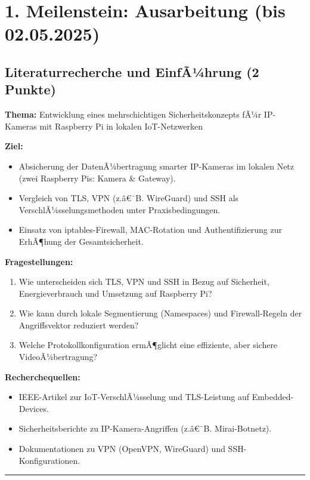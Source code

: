 ﻿\documentclass[a4paper,12pt]{article}
\begin{document}
\section*{1. Meilenstein: Ausarbeitung (bis 02.05.2025)}

\subsection*{Literaturrecherche und EinfÃ¼hrung (2 Punkte)}

\textbf{Thema:} Entwicklung eines mehrschichtigen Sicherheitskonzepts fÃ¼r IP-Kameras mit Raspberry Pi in lokalen IoT-Netzwerken

\bigskip
\textbf{Ziel:}
\begin{itemize}
    \item Absicherung der DatenÃ¼bertragung smarter IP-Kameras im lokalen Netz (zwei Raspberry Pis: Kamera \& Gateway).
    \item Vergleich von TLS, VPN (z.â€¯B. WireGuard) und SSH als VerschlÃ¼sselungsmethoden unter Praxisbedingungen.
    \item Einsatz von iptables-Firewall, MAC-Rotation und Authentifizierung zur ErhÃ¶hung der Gesamtsicherheit.
\end{itemize}

\bigskip
\textbf{Fragestellungen:}
{\renewcommand{\labelenumi}{\arabic*.}%
\begin{enumerate}
    \item Wie unterscheiden sich TLS, VPN und SSH in Bezug auf Sicherheit, Energieverbrauch und Umsetzung auf Raspberry Pi?
    \item Wie kann durch lokale Segmentierung (Namespaces) und Firewall-Regeln der Angriffsvektor reduziert werden?
    \item Welche Protokollkonfiguration ermÃ¶glicht eine effiziente, aber sichere VideoÃ¼bertragung?
\end{enumerate}
}

\bigskip
\textbf{Recherchequellen:}
\begin{itemize}
    \item IEEE-Artikel zur IoT-VerschlÃ¼sselung und TLS-Leistung auf Embedded-Devices.
    \item Sicherheitsberichte zu IP-Kamera-Angriffen (z.â€¯B. Mirai-Botnetz).
    \item Dokumentationen zu VPN (OpenVPN, WireGuard) und SSH-Konfigurationen.
\end{itemize}

\bigskip
\hrule
\bigskip
\end{document}
